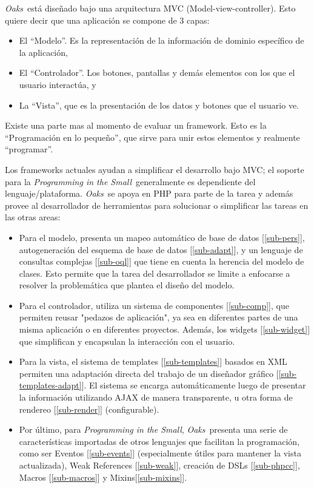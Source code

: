 \documentclass[a4paper,10pt]{article}
\newcommand{\PITS}{\emph{Programming in the Small}} %
\newcommand{\PWB}{\emph{Oaks}}
\begin{document}
\PWB \ está diseñado bajo una arquitectura MVC (Model-view-controller).
Esto quiere decir que una aplicación se compone de 3 capas:
\begin{itemize}
\item El ``Modelo''. Es la representación de la información de dominio específico de la aplicación,
\item El ``Controlador''. Los botones, pantallas y demás elementos con los que el usuario interactúa, y
\item La ``Vista'', que es la presentación de los datos y botones que el usuario ve.
\end{itemize}

Existe una parte mas al momento de evaluar un framework. Esto es la ``Programación en lo pequeño'', que sirve para unir estos elementos y realmente ``programar''.

Los frameworks actuales ayudan a simplificar el desarrollo bajo MVC; el soporte para la \PITS \ generalmente es dependiente del lenguaje/plataforma. \PWB \ se apoya en PHP para parte de la tarea y además provee al desarrollador de herramientas para solucionar o simplificar las tareas en las otras areas:

\begin{itemize}
\item Para el modelo, presenta un mapeo automático de base de datos [\ref{sub-pers}], autogeneración del esquema de base de datos [\ref{sub-adapt}], y un lenguaje de consultas complejas [\ref{sub-oql}] que tiene en cuenta la herencia del modelo de clases.  Esto permite que la tarea del desarrollador se limite a enfocarse a resolver la problemática que plantea el diseño del modelo.

\item Para el controlador, utiliza un sistema de componentes [\ref{sub-comp}], que permiten reusar "pedazos de aplicación", ya sea en diferentes partes de una misma aplicación o en diferentes proyectos. Además, los widgets [\ref{sub-widget}] que simplifican y encapsulan la interacción con el usuario.

\item Para la vista, el sistema de templates [\ref{sub-templates}] basados en XML permiten una adaptación directa del trabajo de un diseñador gráfico [\ref{sub-templates-adapt}]. El sistema se encarga automáticamente luego de presentar la información utilizando AJAX de manera transparente, u otra forma de rendereo [\ref{sub-render}] (configurable).

\item Por último, para \PITS, \PWB \ presenta una serie de características importadas de otros lenguajes que facilitan la programación, como ser Eventos [\ref{sub-events}] (especialmente útiles para mantener la vista actualizada), Weak References [\ref{sub-weak}], creación de DSLs [\ref{sub-phpcc}], Macros [\ref{sub-macros}] y Mixins[\ref{sub-mixins}].
\end{itemize}
\end{document}
